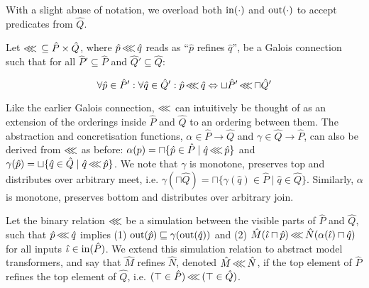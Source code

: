 

\noindent With a slight abuse of notation, we overload both $\operatorname{in}(\cdot)$ and $\operatorname{out}(\cdot)$ to accept predicates from $\hat Q$.

Let $\operatorname{\lll} \, \subseteq \hat P \times \hat Q$, where $\hat p \operatorname{\lll} \hat q$ reads as ``$\hat p$ refines $\hat q$'', be a Galois connection such that for all $\hat P' \subseteq \hat P$ and $\hat Q' \subseteq \hat Q$:

\begin{equation*}
\forall \hat p \in \hat P' : \forall \hat q \in \hat Q' : \hat p \operatorname{\lll} \hat q \Leftrightarrow \sqcup \hat P' \operatorname{\lll} \sqcap \hat Q'
\end{equation*}

\noindent Like the earlier Galois connection, $\operatorname{\lll}$ can intuitively be thought of as an extension of the orderings inside $\hat P$ and $\hat Q$ to an ordering between them. The abstraction and concretisation functions, $\alpha \in \hat P \rightarrow \hat Q$ and $\gamma \in \hat Q \rightarrow \hat P$, can also be derived from $\operatorname{\lll}$ as before: $\alpha(p) = \sqcap \{ \hat p \in \hat P \mid \hat q \operatorname{\lll} \hat p \}$ and $\gamma(\hat p) = \sqcup \{ \hat q \in \hat Q \mid \hat q \operatorname{\lll} \hat p \}$. We note that $\gamma$ is monotone, preserves top and distributes over arbitrary meet, i.e. $\gamma(\sqcap \hat Q) = \sqcap \{ \gamma(\hat q) \in \hat P \mid \hat q \in \hat Q\}$. Similarly, $\alpha$ is monotone, preserves bottom and distributes over arbitrary join.

Let the binary relation $\operatorname{\lll}$ be a simulation between the visible parts of $\hat P$ and $\hat Q$, such that $\hat p \operatorname{\lll} \hat q$ implies (1) $\operatorname{out}(\hat p) \sqsubseteq \gamma(\operatorname{out}(\hat q))$ and (2) $\hat M(\hat \iota \sqcap \hat p) \operatorname{\lll} \hat N(\alpha(\hat \iota) \sqcap \hat q)$ for all inputs $\hat \iota \in \operatorname{in}(\hat P)$. We extend this simulation relation to abstract model transformers, and say that $\hat M$ refines $\hat N$, denoted $\hat M \operatorname{\lll} \hat N$, if the top element of $\hat P$ refines the top element of $\hat Q$, i.e. $(\top \in \hat P) \operatorname{\lll} \, (\top \in \hat Q)$. 


